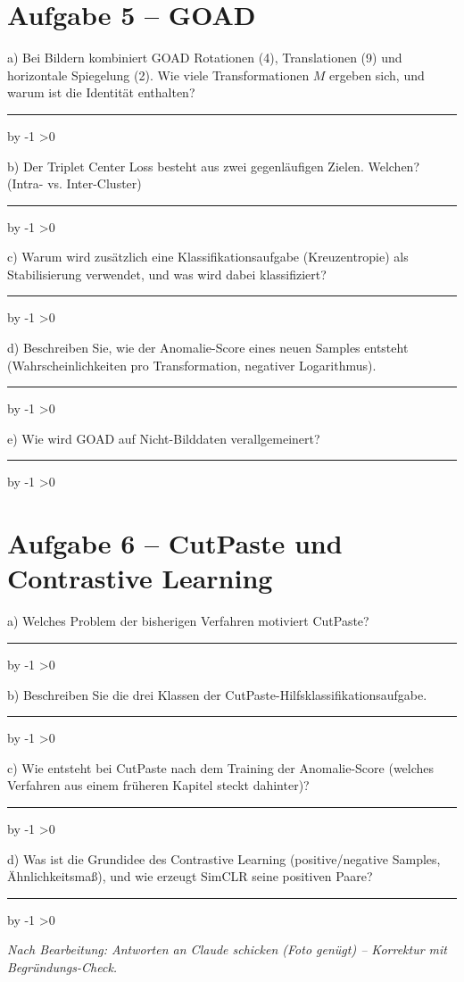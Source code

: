 \documentclass[10pt,a4paper]{article}
\newcommand{\antwortlinien}[1]{%
  \par\vspace{2pt}%
  \newcount\zeilen \zeilen=#1
  \loop
    \noindent\rule{\linewidth}{0.4pt}\par\vspace{11pt}%
    \advance\zeilen by -1
  \ifnum\zeilen>0 \repeat
}
\begin{document}
\section*{Aufgabe 5 -- GOAD}

a) Bei Bildern kombiniert GOAD Rotationen (4), Translationen (9) und horizontale
Spiegelung (2). Wie viele Transformationen $M$ ergeben sich, und warum ist die Identität
enthalten?
\antwortlinien{2}

b) Der Triplet Center Loss besteht aus zwei gegenläufigen Zielen. Welchen?
(Intra- vs. Inter-Cluster)
\antwortlinien{3}

c) Warum wird zusätzlich eine Klassifikationsaufgabe (Kreuzentropie) als Stabilisierung
verwendet, und was wird dabei klassifiziert?
\antwortlinien{3}

d) Beschreiben Sie, wie der Anomalie-Score eines neuen Samples entsteht
(Wahrscheinlichkeiten pro Transformation, negativer Logarithmus).
\antwortlinien{4}

e) Wie wird GOAD auf Nicht-Bilddaten verallgemeinert?
\antwortlinien{2}

\section*{Aufgabe 6 -- CutPaste und Contrastive Learning}

a) Welches Problem der bisherigen Verfahren motiviert CutPaste?
\antwortlinien{2}

b) Beschreiben Sie die drei Klassen der CutPaste-Hilfsklassifikationsaufgabe.
\antwortlinien{3}

c) Wie entsteht bei CutPaste nach dem Training der Anomalie-Score
(welches Verfahren aus einem früheren Kapitel steckt dahinter)?
\antwortlinien{3}

d) Was ist die Grundidee des Contrastive Learning (positive/negative Samples,
Ähnlichkeitsmaß), und wie erzeugt SimCLR seine positiven Paare?
\antwortlinien{4}

\vspace{10pt}
\begin{center}
\footnotesize\itshape
Nach Bearbeitung: Antworten an Claude schicken (Foto genügt) -- Korrektur mit Begründungs-Check.
\end{center}
\end{document}
